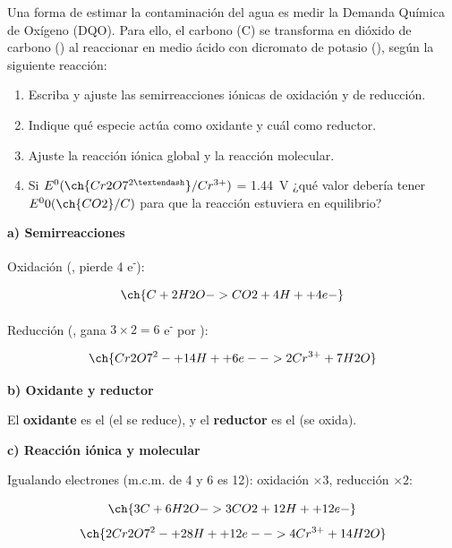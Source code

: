\begin{exerciseEVAU}
    Una forma de estimar la contaminación del agua es medir la Demanda Química de Oxígeno (DQO). Para
ello, el carbono (C) se transforma en dióxido de carbono () al reaccionar en medio ácido con dicromato
de potasio (), según la siguiente reacción:
    \begin{centeredequation}
    \end{centeredequation}
    \begin{enumerate}[label=\letraminuscula]
        \item Escriba y ajuste las semirreacciones iónicas de oxidación y de reducción.
        \item Indique qué especie actúa como oxidante y cuál como reductor.
        \item Ajuste la reacción iónica global y la reacción molecular.
        \item Si \( E^0(\ch{Cr2O7^{2–}}/Cr^{3+}) \) = \qty{1.44}{\volt}  ¿qué valor debería tener \( E^00(\ch{CO2}/C) \) para que la reacción estuviera en equilibrio?
    \end{enumerate}
\begin{solu}

    \textbf{a) Semirreacciones}

    Oxidación (, pierde 4 e\textsuperscript{-}):

    \begin{equation*}
        \ch{C + 2 H2O -> CO2 + 4 H+ + 4 e-}
    \end{equation*}

    Reducción (, gana \(3\times2=6\) e\textsuperscript{-} por ):

    \begin{equation*}
        \ch{Cr2O7^2- + 14 H+ + 6 e- -> 2 Cr^{3+} + 7 H2O}
    \end{equation*}

    \textbf{b) Oxidante y reductor}

    El \textbf{oxidante} es el  (el  se reduce), y el \textbf{reductor} es el  (se oxida).

    \textbf{c) Reacción iónica y molecular}

    Igualando electrones (m.c.m. de 4 y 6 es 12): oxidación \(\times 3\), reducción \(\times 2\):

    \begin{equation*}
        \ch{3 C + 6 H2O -> 3 CO2 + 12 H+ + 12 e-}
    \end{equation*}
    \begin{equation*}
        \ch{2 Cr2O7^2- + 28 H+ + 12 e- -> 4 Cr^{3+} + 14 H2O}
    \end{equation*}


\end{solu}
\end{exerciseEVAU}

